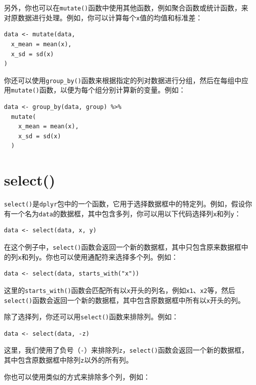 \documentclass[
  letterpaper,
  DIV=11,
  numbers=noendperiod]{scrreprt}
\begin{document}
另外，你也可以在\texttt{mutate()}函数中使用其他函数，例如聚合函数或统计函数，来对原数据进行处理。例如，你可以计算每个\texttt{x}值的均值和标准差：

\begin{verbatim}
data <- mutate(data,
  x_mean = mean(x),
  x_sd = sd(x)
)
\end{verbatim}

你还可以使用\texttt{group\_by()}函数来根据指定的列对数据进行分组，然后在每组中应用\texttt{mutate()}函数，以便为每个组分别计算新的变量。例如：

\begin{verbatim}
data <- group_by(data, group) %>%
  mutate(
    x_mean = mean(x),
    x_sd = sd(x)
  )
\end{verbatim}

\hypertarget{select}{%
\section{select()}\label{select}}

\texttt{select()}是\texttt{dplyr}包中的一个函数，它用于选择数据框中的特定列。例如，假设你有一个名为\texttt{data}的数据框，其中包含多列，你可以用以下代码选择列\texttt{x}和列\texttt{y}：

\begin{verbatim}
data <- select(data, x, y)
\end{verbatim}

在这个例子中，\texttt{select()}函数会返回一个新的数据框，其中只包含原来数据框中的列\texttt{x}和列\texttt{y}。你也可以使用通配符来选择多个列。例如：

\begin{verbatim}
data <- select(data, starts_with("x"))
\end{verbatim}

这里的\texttt{starts\_with()}函数会匹配所有以\texttt{x}开头的列名，例如\texttt{x1}、\texttt{x2}等，然后\texttt{select()}函数会返回一个新的数据框，其中包含原数据框中所有以\texttt{x}开头的列。

除了选择列，你还可以用\texttt{select()}函数来排除列。例如：

\begin{verbatim}
data <- select(data, -z)
\end{verbatim}

这里，我们使用了负号（\texttt{-}）来排除列\texttt{z}，\texttt{select()}函数会返回一个新的数据框，其中包含原数据框中除列\texttt{z}以外的所有列。

你也可以使用类似的方式来排除多个列，例如：
\end{document}
